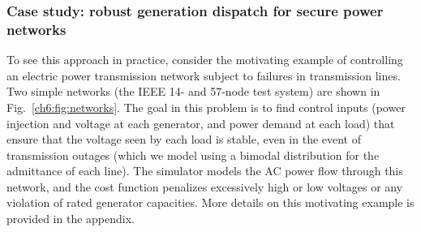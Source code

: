 


\subsubsection{Case study: robust generation dispatch for secure power networks}

To see this approach in practice, consider the motivating example of controlling an electric power transmission network subject to failures in transmission lines. Two simple networks (the IEEE 14- and 57-node test system) are shown in Fig.~\ref{ch6:fig:networks}. The goal in this problem is to find control inputs (power injection and voltage at each generator, and power demand at each load) that ensure that the voltage seen by each load is stable, even in the event of transmission outages (which we model using a bimodal distribution for the admittance of each line). The simulator models the AC power flow through this network, and the cost function penalizes excessively high or low voltages or any violation of rated generator capacities. More details on this motivating example is provided in the appendix.

